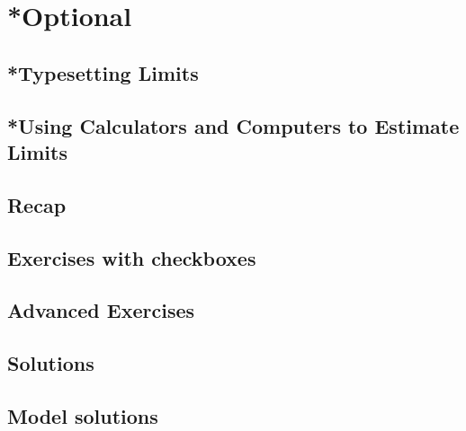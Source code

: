 \documentclass[11pt,letterpaper,twoside]{book}
\begin{document}
\newpage
\section{*Optional}
\subsection{*Typesetting Limits}
\subsection{*Using Calculators and Computers to Estimate Limits}
\subsection{Recap}
\subsection{Exercises with checkboxes}
\subsection{Advanced Exercises}
\subsection{Solutions}
\subsection{Model solutions}
\end{document}
